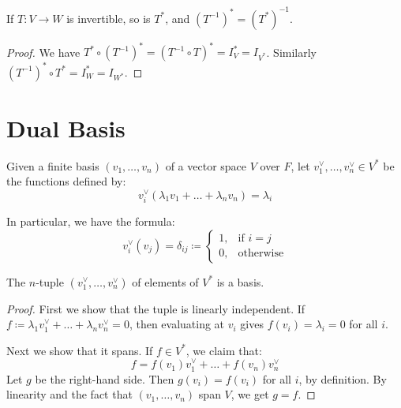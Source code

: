 \documentclass[../linear_algebra_and_groups.tex]{subfiles}
\begin{document}
\begin{corollary}
    \begin{shaded*}
    If $T : V \to W$ is invertible, so is $T^*$, and $(T^{-1})^* = (T^*)^{-1}$.
    \end{shaded*}
\end{corollary}
\begin{proof}
    We have $T^* \circ (T^{-1})^* = (T^{-1} \circ T)^* = I_V^* = I_{V^*}$. Similarly $(T^{-1})^* \circ T^* = I_W^* = I_{W^*}$.
    \qedhere
\end{proof}

\section{Dual Basis}

\begin{definition}
    \begin{shaded*}
        Given a finite basis $(v_1, \dots, v_n)$ of a vector space $V$ over $F$, let $v_1^\vee, \dots, v_n^\vee \in V^*$ be the functions defined by:
        \[ v_i^\vee(\lambda_1 v_1 + \dots + \lambda_n v_n) = \lambda_i \]
    \end{shaded*}
\end{definition}

In particular, we have the formula: \[v_i^\vee(v_j) = \delta_{ij} \coloneqq \begin{cases} 1, & \text{if } i = j \\ 0, & \text{otherwise} \end{cases}\]

\begin{proposition}
    \begin{shaded*}
    The $n$-tuple $(v_1^\vee, \dots, v_n^\vee)$ of elements of $V^*$ is a basis.
    \end{shaded*}
\end{proposition}
\begin{proof}
    First we show that the tuple is linearly independent. If $f \coloneqq \lambda_1 v_1^\vee + \dots + \lambda_n v_n^\vee = 0$, then evaluating at $v_i$ gives $f(v_i) = \lambda_i = 0$ for all $i$. 
    
    Next we show that it spans. If $f \in V^*$, we claim that:
    \begin{equation}
        f = f(v_1)v_1^\vee + \dots + f(v_n)v_n^\vee
    \end{equation}
    Let $g$ be the right-hand side. Then $g(v_i) = f(v_i)$ for all $i$, by definition. By linearity and the fact that $(v_1, \dots, v_n)$ span $V$, we get $g = f$.
    \qedhere
\end{proof}
\end{document}
